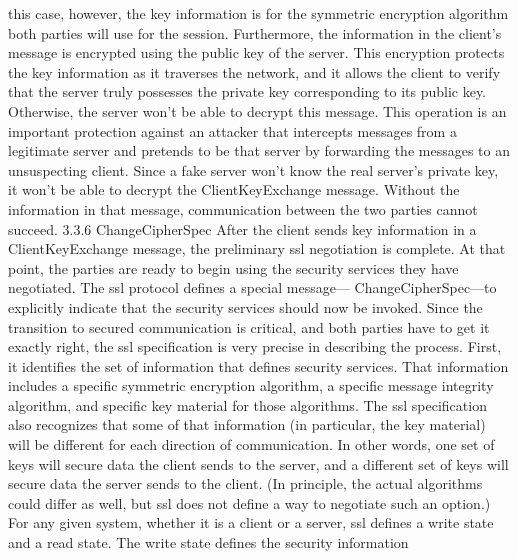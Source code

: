 this case, however, the key information is for the symmetric encryption algorithm both parties will use for the session. Furthermore, the
information in the client’s message is encrypted using the public key
of the server. This encryption protects the key information as it traverses the network, and it allows the client to verify that the server
truly possesses the private key corresponding to its public key. Otherwise, the server won’t be able to decrypt this message. This operation is an important protection against an attacker that intercepts
messages from a legitimate server and pretends to be that server by
forwarding the messages to an unsuspecting client. Since a fake
server won’t know the real server’s private key, it won’t be able to decrypt the ClientKeyExchange message. Without the information in
that message, communication between the two parties cannot succeed.
3.3.6 ChangeCipherSpec
After the client sends key information in a ClientKeyExchange message, the preliminary ssl negotiation is complete. At that point, the
parties are ready to begin using the security services they have negotiated. The ssl protocol defines a special message—
ChangeCipherSpec—to explicitly indicate that the security services
should now be invoked.
Since the transition to secured communication is critical, and both
parties have to get it exactly right, the ssl specification is very precise
in describing the process. First, it identifies the set of information
that defines security services. That information includes a specific
symmetric encryption algorithm, a specific message integrity algorithm, and specific key material for those algorithms. The ssl specification also recognizes that some of that information (in particular,
the key material) will be different for each direction of communication. In other words, one set of keys will secure data the client sends
to the server, and a different set of keys will secure data the server
sends to the client. (In principle, the actual algorithms could differ as
well, but ssl does not define a way to negotiate such an option.) For
any given system, whether it is a client or a server, ssl defines a write
state and a read state. The write state defines the security information

